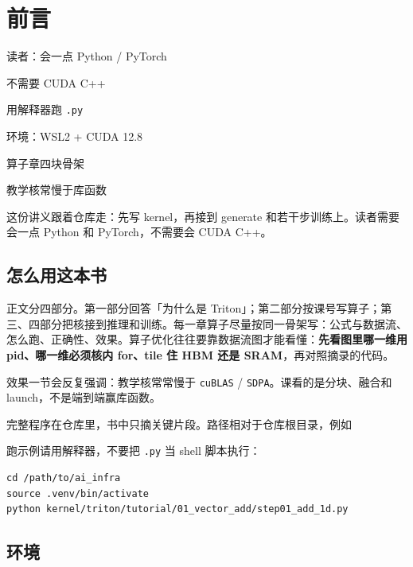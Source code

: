 \chapter*{前言}
{}

\begin{introduction}
  \item 读者：会一点 Python / PyTorch
  \item 不需要 CUDA C++
  \item 用解释器跑 \texttt{.py}
  \item 环境：WSL2 + CUDA 12.8
  \item 算子章四块骨架
  \item 教学核常慢于库函数
\end{introduction}

这份讲义跟着仓库走：先写 kernel，再接到 generate 和若干步训练上。读者需要会一点 Python 和 PyTorch，不需要会 CUDA C++。

\section*{怎么用这本书}

正文分四部分。第一部分回答「为什么是 Triton」；第二部分按课号写算子；第三、四部分把核接到推理和训练。每一章算子尽量按同一骨架写：公式与数据流、怎么跑、正确性、效果。算子优化往往要靠数据流图才能看懂：\textbf{先看图里哪一维用 pid、哪一维必须核内 for、tile 住 HBM 还是 SRAM}，再对照摘录的代码。

\begin{note}
效果一节会反复强调：教学核常常慢于 \texttt{cuBLAS} / \texttt{SDPA}。课看的是分块、融合和 launch，不是端到端赢库函数。
\end{note}

完整程序在仓库里，书中只摘关键片段。路径相对于仓库根目录，例如

{\centering{}\par}

\begin{runcmd}[启动方式]
跑示例请用解释器，不要把 \texttt{.py} 当 shell 脚本执行：
\begin{lstlisting}[style=shell]
cd /path/to/ai_infra
source .venv/bin/activate
python kernel/triton/tutorial/01_vector_add/step01_add_1d.py
\end{lstlisting}
\end{runcmd}

\section*{环境}

